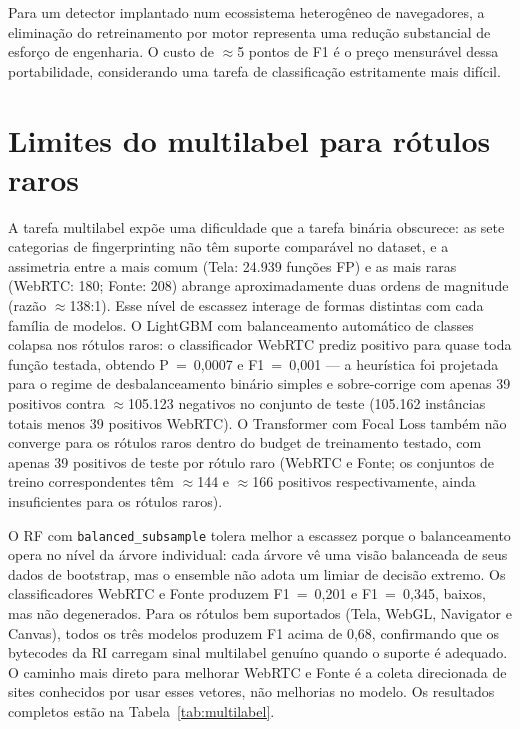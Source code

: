 Para um detector implantado num ecossistema heterogêneo de navegadores, a
eliminação do retreinamento por motor representa uma redução substancial de esforço
de engenharia. O custo de $\approx$5 pontos de F1 é o preço mensurável dessa
portabilidade, considerando uma tarefa de classificação estritamente mais difícil.

\section{Limites do multilabel para rótulos raros}
\label{sec:disc-raro}

A tarefa multilabel expõe uma dificuldade que a tarefa binária obscurece: as sete
categorias de fingerprinting não têm suporte comparável no dataset, e a
assimetria entre a mais comum (Tela: 24.939 funções FP) e as mais raras (WebRTC:
180; Fonte: 208) abrange aproximadamente duas ordens de magnitude (razão $\approx$138:1). Esse nível de escassez interage
de formas distintas com cada família de modelos. O LightGBM com balanceamento automático de classes colapsa nos rótulos raros:
o classificador WebRTC prediz positivo para quase toda função testada, obtendo
P~=~0,0007 e F1~=~0,001 --- a heurística foi projetada para o regime de
desbalanceamento binário simples e sobre-corrige com apenas 39 positivos contra
$\approx$105.123 negativos no conjunto de teste (105.162 instâncias totais menos
39 positivos WebRTC).
O Transformer com Focal Loss também não converge para os rótulos raros dentro
do budget de treinamento testado, com apenas 39 positivos de teste por rótulo raro
(WebRTC e Fonte; os conjuntos de treino correspondentes têm $\approx$144 e
$\approx$166 positivos respectivamente, ainda insuficientes para os rótulos raros).

O RF com \texttt{balanced\_subsample} tolera melhor a escassez porque o balanceamento
opera no nível da árvore individual: cada árvore vê uma visão balanceada de seus
dados de bootstrap, mas o ensemble não adota um limiar de decisão extremo. Os
classificadores WebRTC e Fonte produzem F1~=~0,201 e F1~=~0,345, baixos, mas não
degenerados. Para os rótulos bem suportados (Tela, WebGL, Navigator e Canvas), todos
os três modelos produzem F1 acima de 0,68, confirmando que os bytecodes da RI
carregam sinal multilabel genuíno quando o suporte é adequado. O caminho mais direto
para melhorar WebRTC e Fonte é a coleta direcionada de sites conhecidos por usar
esses vetores, não melhorias no modelo. Os resultados completos estão na
Tabela~\ref{tab:multilabel}.


